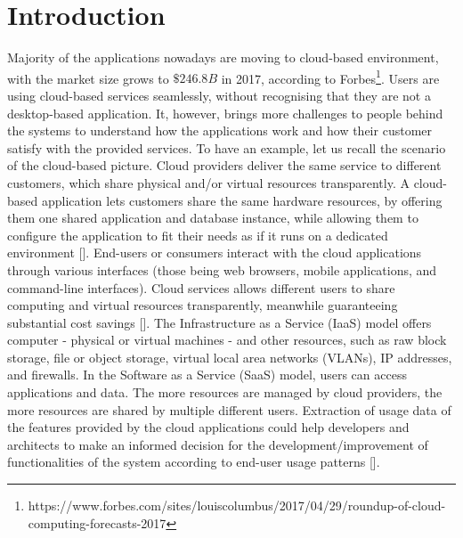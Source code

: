 \section{Introduction}\label{sec:Introduction}
%
Majority of the applications nowadays are moving to cloud-based environment, with the market size grows to $\$246.8B$ in 2017, according to Forbes\footnote{https://www.forbes.com/sites/louiscolumbus/2017/04/29/roundup-of-cloud-computing-forecasts-2017}. Users are using cloud-based services seamlessly, without recognising that they are not a desktop-based application. It, however, brings more challenges to people behind the systems to understand how the applications work and how their customer satisfy with the provided services. To have an example, let us recall the scenario of the cloud-based picture. Cloud providers deliver the same service to different customers, which share physical and/or virtual resources transparently. A cloud-based application lets customers share the same hardware resources, by offering them one shared application and database instance, while allowing them to configure the application to fit their needs as if it runs on a dedicated environment []. End-users or consumers interact with the cloud applications through various interfaces (those being web browsers, mobile applications, and command-line interfaces). Cloud services allows different users to share computing and virtual resources transparently, meanwhile guaranteeing substantial cost savings []. The Infrastructure as a Service (IaaS) model offers computer - physical or virtual machines - and other resources, such as raw block storage, file or object storage, virtual local area networks (VLANs), IP addresses, and firewalls. In the Software as a Service (SaaS) model, users can access applications and data. The more resources are managed by cloud providers, the more resources are shared by multiple different users. Extraction of usage data of the features provided by the cloud applications could help developers and architects to make an informed decision for the development/improvement of functionalities of the system according to end-user usage patterns []. 

